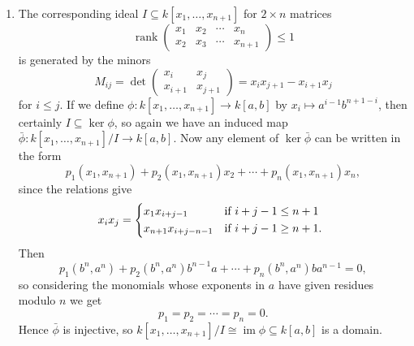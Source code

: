 \documentclass{report}
\newcommand{\induced}[1]{\bar{#1}} %
\DeclareMathOperator{\im}{im}
\DeclareMathOperator{\rank}{rank}
\begin{document}
\begin{enumerate}[label=\textbf{3.6.\Alph*.}]
\begin{enumerate}[label=(\alph*)]
		      \item The corresponding ideal $I\subseteq k[x_1,\ldots,x_{n+1}]$ for
		            $2\times n$ matrices
		            \begin{equation*}
			            \rank\begin{pmatrix}
				            x_1 & x_2 & \cdots & x_n     \\
				            x_2 & x_3 & \cdots & x_{n+1}
			            \end{pmatrix} \le 1
		            \end{equation*}
		            is generated by the minors
		            \begin{equation*}
			            M_{ij} = \det\begin{pmatrix}
				            x_i     & x_j     \\
				            x_{i+1} & x_{j+1}
			            \end{pmatrix}
			            = x_ix_{j+1} - x_{i+1}x_j
		            \end{equation*}
		            for $i\le j$. If we define $\phi:k[x_1,\ldots,x_{n+1}]\to k[a,b]$
		            by $x_i\mapsto a^{i-1}b^{n+1-i}$, then certainly
		            $I\subseteq\ker\phi$, so again we have an induced map
		            $\induced\phi:k[x_1,\ldots,x_{n+1}]/I\to k[a,b]$. Now any
		            element of $\ker\induced\phi$ can be written in the form
		            \begin{equation*}
			            p_1(x_1,x_{n+1}) + p_2(x_1,x_{n+1})x_2
			            + \cdots + p_n(x_1,x_{n+1})x_n,
		            \end{equation*}
		            since the relations give
		            \begin{equation*}
			            x_ix_j = \begin{cases*}
				            x_1x_{i+j-1}       & if $i+j-1\le n+1$  \\
				            x_{n+1}x_{i+j-n-1} & if $i+j-1\ge n+1$.
			            \end{cases*}
		            \end{equation*}
		            Then
		            \begin{equation*}
			            p_1(b^n,a^n) + p_2(b^n,a^n)b^{n-1}a
			            + \cdots + p_n(b^n,a^n)ba^{n-1} = 0,
		            \end{equation*}
		            so considering the monomials whose exponents in $a$ have given
		            residues modulo $n$ we get
		            \begin{equation*}
			            p_1 = p_2 = \cdots = p_n = 0.
		            \end{equation*}
		            Hence $\induced\phi$ is injective, so
		            $k[x_1,\ldots,x_{n+1}]/I\cong\im\phi\subseteq k[a,b]$ is a
		            domain.
	      \end{enumerate}


\end{enumerate}
\end{document}
